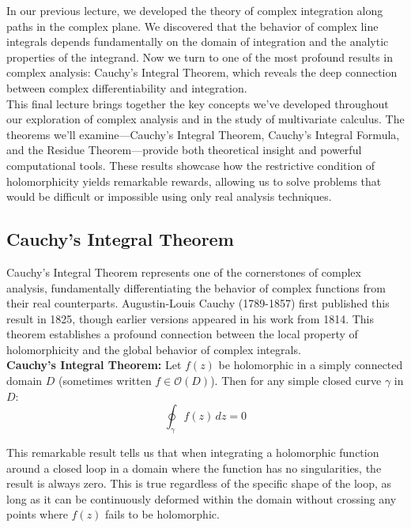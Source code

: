   

\noindent In our previous lecture, we developed the theory of complex integration along paths in the complex plane. We discovered that the behavior of complex line integrals depends fundamentally on the domain of integration and the analytic properties of the integrand. Now we turn to one of the most profound results in complex analysis: Cauchy's Integral Theorem, which reveals the deep connection between complex differentiability and integration. \\

\noindent This final lecture brings together the key concepts we've developed throughout our exploration of complex analysis and in the study of multivariate calculus. The theorems we'll examine—Cauchy's Integral Theorem, Cauchy's Integral Formula, and the Residue Theorem—provide both theoretical insight and powerful computational tools. These results showcase how the restrictive condition of holomorphicity yields remarkable rewards, allowing us to solve problems that would be difficult or impossible using only real analysis techniques.

\subsection*{Cauchy's Integral Theorem}

\noindent Cauchy's Integral Theorem represents one of the cornerstones of complex analysis, fundamentally differentiating the behavior of complex functions from their real counterparts. Augustin-Louis Cauchy (1789-1857) first published this result in 1825, though earlier versions appeared in his work from 1814. This theorem establishes a profound connection between the local property of holomorphicity and the global behavior of complex integrals. \\

\noindent \textbf{Cauchy's Integral Theorem:} Let $f(z)$ be holomorphic in a simply connected domain $D$ (sometimes written $f \in \mathcal{O}(D)$). Then for any simple closed curve $\gamma$ in $D$:
\[
\oint_{\gamma} f(z) \, dz = 0
\]

\noindent This remarkable result tells us that when integrating a holomorphic function around a closed loop in a domain where the function has no singularities, the result is always zero. This is true regardless of the specific shape of the loop, as long as it can be continuously deformed within the domain without crossing any points where $f(z)$ fails to be holomorphic. \\

